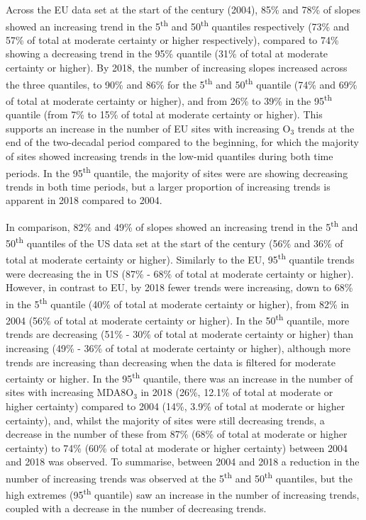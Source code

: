 \documentclass[journal abbreviation, manuscript]{copernicus}
\begin{document}
Across the EU data set at the start of the century (2004), 85\% and 78\% of slopes showed an increasing trend in the 5\textsuperscript{th} and 50\textsuperscript{th} quantiles respectively (73\% and 57\% of total at moderate certainty or higher respectively), compared to 74\% showing a decreasing trend in the 95\% quantile (31\% of total at moderate certainty or higher). By 2018, the number of increasing slopes increased across the three quantiles, to 90\% and 86\% for the 5\textsuperscript{th} and 50\textsuperscript{th} quantile (74\% and 69\% of total at moderate certainty or higher), and from 26\% to 39\% in the 95\textsuperscript{th} quantile (from 7\% to 15\% of total at moderate certainty or higher). This supports an increase in the number of EU sites with increasing O$_3$ trends at the end of the two-decadal period compared to the beginning, for which the majority of sites showed increasing trends in the low-mid quantiles during both time periods. In the 95\textsuperscript{th} quantile, the majority of sites were are showing decreasing trends in both time periods, but a larger proportion of increasing trends is apparent in 2018 compared to 2004. 

In comparison, 82\%  and 49\% of slopes showed an increasing trend in the 5\textsuperscript{th} and 50\textsuperscript{th} quantiles of the US data set at the start of the century (56\% and 36\% of total at moderate certainty or higher). Similarly to the EU, 95\textsuperscript{th} quantile trends were decreasing the in US (87\% - 68\% of total at moderate certainty or higher). However, in contrast to EU, by 2018 fewer trends were increasing, down to 68\% in the 5\textsuperscript{th} quantile (40\% of total at moderate certainty or higher), from 82\% in 2004 (56\% of total at moderate certainty or higher). In the 50\textsuperscript{th} quantile, more trends are decreasing (51\% - 30\% of total at moderate certainty or higher) than increasing (49\% - 36\% of total at moderate certainty or higher), although more trends are increasing than decreasing when the data is filtered for moderate certainty or higher. In the 95\textsuperscript{th} quantile, there was an increase in the number of sites with increasing MDA8O$_3$ in 2018 (26\%, 12.1\% of total at moderate or higher certainty) compared to 2004 (14\%, 3.9\% of total at moderate or higher certainty), and, whilst the majority of sites were still decreasing trends, a decrease in the number of these from 87\% (68\% of total at moderate or higher certainty) to 74\% (60\% of total at moderate or higher certainty) between 2004 and 2018 was observed. To summarise, between 2004 and 2018 a reduction in the number of increasing trends was observed at the 5\textsuperscript{th} and 50\textsuperscript{th} quantiles, but the high extremes (95\textsuperscript{th} quantile) saw an increase in the number of increasing trends, coupled with a decrease in the number of decreasing trends.
\end{document}
